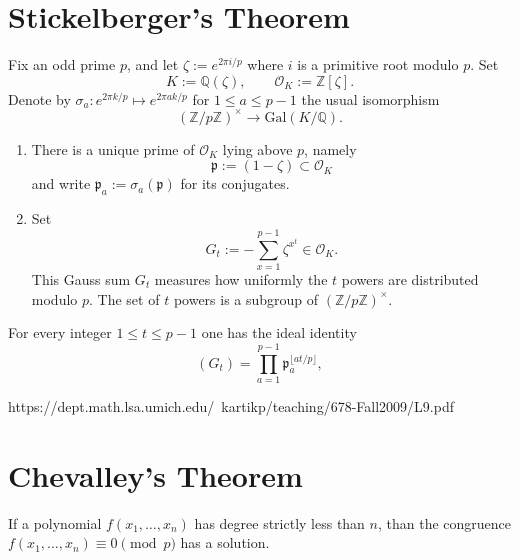 \section{Stickelberger's Theorem}

Fix an odd prime $p$, and let $\zeta:=e^{2\pi i/p}$ where $i$ is a primitive root modulo $p$. Set
\begin{equation*}
  K:=\mathbb{Q}(\zeta),\qquad \mathcal{O}_K:=\mathbb{Z}[\zeta].
\end{equation*}
Denote by $\sigma_a:e^{2\pi k/p}\mapsto e^{2\pi ak/p}$ for $1\leq a\leq p-1$ the usual isomorphism
\begin{equation*}
  (\mathbb{Z}/p\mathbb{Z})^\times \to \mathrm{Gal}(K/\mathbb{Q}).
\end{equation*}
\begin{enumerate}
\item There is a unique prime of $\mathcal{O}_K$ lying above $p$, namely
  \begin{equation*}
    \mathfrak{p}:=(1-\zeta)\subset \mathcal{O}_K
  \end{equation*}
  and write $\mathfrak{p}_a:=\sigma_a(\mathfrak{p})$ for its conjugates.
\item Set
  \begin{equation*}
    G_t := -\sum_{x=1}^{p-1}\zeta^{x^t}\in\mathcal{O}_K.
  \end{equation*}
  This Gauss sum $G_t$ measures how uniformly the $t$\supth{} powers are distributed modulo $p$. The set of $t$\supth{} powers is a subgroup of $(\mathbb{Z}/p\mathbb{Z})^\times$. 
\end{enumerate}
\begin{theorem}
  For every integer $1\leq t\leq p-1$ one has the ideal identity
  \begin{equation*}
    (G_t) = \prod_{a=1}^{p-1}\mathfrak{p}_a^{\lfloor at/p\rfloor},
  \end{equation*}
\end{theorem}

https://dept.math.lsa.umich.edu/~kartikp/teaching/678-Fall2009/L9.pdf


\section{Chevalley's Theorem}

\begin{theorem}
  If a polynomial $f(x_1,\ldots,x_n)$ has degree strictly less than $n$, than the congruence $f(x_1,\ldots,x_n)\equiv 0\pmod{p}$ has a solution.
\end{theorem}

